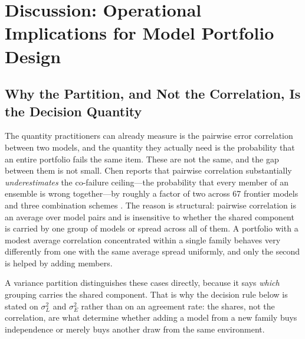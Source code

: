 \documentclass{ieeeaccess}
\theoremstyle{definition}
\theoremstyle{plain}
\begin{document}

\section{Discussion: Operational Implications for Model Portfolio Design}
\label{sec:discussion}

\subsection{Why the Partition, and Not the Correlation, Is the Decision
Quantity}
The quantity practitioners can already measure is the pairwise error
correlation between two models, and the quantity they actually need is the
probability that an entire portfolio fails the same item. These are not the
same, and the gap between them is not small. Chen reports that pairwise
correlation substantially \emph{underestimates} the co-failure ceiling---the
probability that every member of an ensemble is wrong together---by roughly a
factor of two across 67 frontier models and three combination schemes
\cite{chen2026}. The reason is structural: pairwise correlation is an average
over model pairs and is insensitive to whether the shared component is carried
by one group of models or spread across all of them. A portfolio with a modest
average correlation concentrated within a single family behaves very
differently from one with the same average spread uniformly, and only the
second is helped by adding members.

A variance partition distinguishes these cases directly, because it says
\emph{which} grouping carries the shared component. That is why the decision
rule below is stated on $\sigma^{2}_{L}$ and $\sigma^{2}_{E}$ rather than on an
agreement rate: the shares, not the correlation, are what determine whether
adding a model from a new family buys independence or merely buys another draw
from the same environment.
\end{document}
